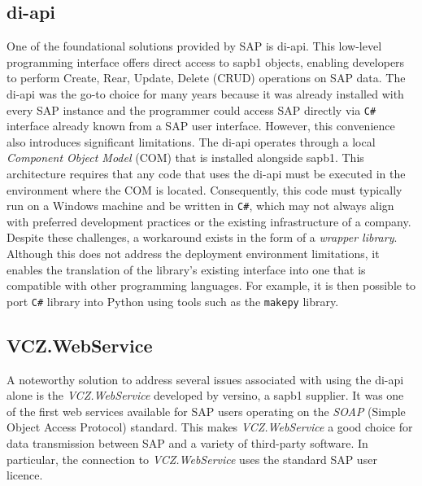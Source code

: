 \subsection{\gls{di-api}}
\label{subsec:sap-b1-di-api}

One of the foundational solutions provided by SAP is \gls{di-api}.
This low-level programming interface offers direct access to \gls{sapb1} objects, enabling developers to perform Create, Rear, Update, Delete (\ac{CRUD}) operations on SAP data. 
The \gls{di-api} was the go-to choice for many years because it was already installed with every SAP instance and the programmer could access SAP directly via \texttt{C\#} interface already known from a SAP user interface.
However, this convenience also introduces significant limitations.
The \gls{di-api} operates through a local \textit{Component Object Model} (COM) that is installed alongside \gls{sapb1}.
This architecture requires that any code that uses the \gls{di-api} must be executed in the environment where the COM is located.
Consequently, this code must typically run on a Windows machine and be written in \texttt{C\#}, which may not always align with preferred development practices or the existing infrastructure of a company.
Despite these challenges, a workaround exists in the form of a \textit{wrapper library}.
Although this does not address the deployment environment limitations, it enables the translation of the library's existing interface into one that is compatible with other programming languages.
For example, it is then possible to port \texttt{C\#} library into Python using tools such as the \texttt{makepy} library.


\subsection{VCZ.WebService}
A noteworthy solution to address several issues associated with using the \gls{di-api} alone  is the \textit{VCZ.WebService} developed by \gls{versino}, a \gls{sapb1} supplier. 
It was one of the first web services available for SAP users operating on the \textit{SOAP} (Simple Object Access Protocol) standard. 
This makes \textit{VCZ.WebService} a good choice for data transmission between SAP and a variety of third-party software.
In particular, the connection to \textit{VCZ.WebService} uses the standard SAP user licence.


